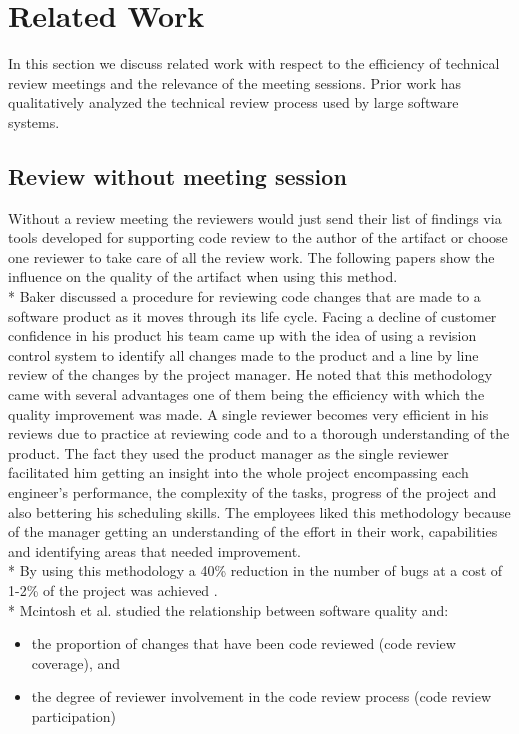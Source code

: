 \section{Related Work}
In this section we discuss related work with respect to the efficiency of technical review meetings and the relevance of the meeting sessions. Prior work has qualitatively analyzed the technical review process used by large software systems.

\subsection{Review without meeting session}
Without a review meeting the reviewers would just send their list of findings via tools developed for supporting code review to the author of the artifact or choose one reviewer to take care of all the review work. The following papers show the influence on the quality of the artifact when using this method. \\* 
Baker discussed a procedure for reviewing code changes that are made to a software product as it moves through its life cycle. Facing a decline of customer confidence in his product his team came up with the idea of using a revision control system to identify all changes made to the product and a line by line review of the changes by the project manager. He noted that this methodology came with several advantages one of them being the efficiency with which the quality improvement was made. A single reviewer becomes very efficient in his reviews due to practice at reviewing code and to a thorough understanding of the product. The fact they used the product manager as the single reviewer facilitated him getting an insight into the whole project encompassing each engineer's performance, the complexity of the tasks, progress of the project and also bettering his scheduling skills. The employees liked this methodology because of the manager getting an understanding of the effort in their work, capabilities and identifying areas that needed improvement. \\*
By using this methodology a 40\% reduction in the number of bugs at a cost of 1-2\% of the project was achieved \cite{Baker:1997:CRE:253228.253461}. \\*
Mcintosh et al. studied the relationship between software quality and:
\begin{itemize}
	\item the proportion of changes that have been code reviewed (code review coverage), and
	\item the degree of reviewer involvement in the code review process (code review participation)
\end{itemize}
